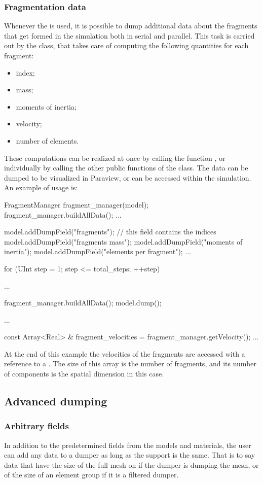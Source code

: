 \subsubsection{Fragmentation data}

Whenever the  is used, it is
possible to dump additional data about the fragments that get formed
in the simulation both in serial and parallel. This task is carried
out by the  class, that takes care of computing
the following quantities for each fragment:
\begin{itemize}
\item index;
\item mass;
\item moments of inertia;
\item velocity;
\item number of elements.
\end{itemize}
These computations can be realized at once by calling the function
, or individually by calling the other public
functions of the class. The data can be dumped to be visualized in
Paraview, or can be accessed within the simulation. An example of
usage is:
\begin{cpp}
  FragmentManager fragment_manager(model);
  fragment_manager.buildAllData();
  ...

  model.addDumpField("fragments");       // this field contains the indices
  model.addDumpField("fragments mass");
  model.addDumpField("moments of inertia");
  model.addDumpField("elements per fragment");
  ...

  for (UInt step = 1; step <= total_steps; ++step) {
    ...

    fragment_manager.buildAllData();
    model.dump();
  }
  ...

  const Array<Real> & fragment_velocities = fragment_manager.getVelocity();
  ...
\end{cpp}
At the end of this example the velocities of the fragments are
accessed with a reference to a . The size of
this array is the number of fragments, and its number of components is
the spatial dimension in this case.


\subsection{Advanced dumping}

\subsubsection{Arbitrary fields}
In addition to the predetermined fields from the models and materials, the user
can add any data to a dumper as long as the support is the same. That is to say
data that have the size of the full mesh on if the dumper is dumping the mesh,
or of the size of an element group if it is a filtered dumper.

